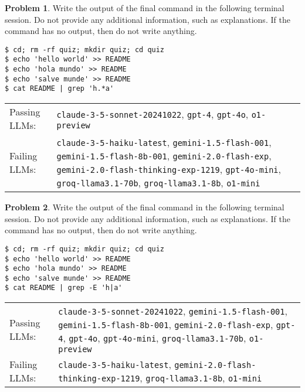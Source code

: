 \documentclass[10pt]{article}
\theoremstyle{definition}
\newtheorem{problem}{Problem}
\begin{document}
\begin{samepage}

\begin{problem}
Write the output of the final command in the following terminal session.
Do not provide any additional information,
such as explanations.
If the command has no output,
then do not write anything.

\end{problem}
\begin{lstlisting}
$ cd; rm -rf quiz; mkdir quiz; cd quiz
$ echo 'hello world' >> README
$ echo 'hola mundo' >> README
$ echo 'salve munde' >> README
$ cat README | grep 'h.*a'
\end{lstlisting}


\noindent
\begin{tabular}{p{1.0in}L{5in}}
Passing LLMs: & {\lstinline$claude-3-5-sonnet-20241022$}, {\lstinline$gpt-4$}, {\lstinline$gpt-4o$}, {\lstinline$o1-preview$} \\
Failing LLMs: & {\lstinline$claude-3-5-haiku-latest$}, {\lstinline$gemini-1.5-flash-001$}, {\lstinline$gemini-1.5-flash-8b-001$}, {\lstinline$gemini-2.0-flash-exp$}, {\lstinline$gemini-2.0-flash-thinking-exp-1219$}, {\lstinline$gpt-4o-mini$}, {\lstinline$groq-llama3.1-70b$}, {\lstinline$groq-llama3.1-8b$}, {\lstinline$o1-mini$} \\
\end{tabular}

\end{samepage}
\begin{samepage}

\begin{problem}
Write the output of the final command in the following terminal session.
Do not provide any additional information,
such as explanations.
If the command has no output,
then do not write anything.

\end{problem}
\begin{lstlisting}
$ cd; rm -rf quiz; mkdir quiz; cd quiz
$ echo 'hello world' >> README
$ echo 'hola mundo' >> README
$ echo 'salve munde' >> README
$ cat README | grep -E 'h|a'
\end{lstlisting}


\noindent
\begin{tabular}{p{1.0in}L{5in}}
Passing LLMs: & {\lstinline$claude-3-5-sonnet-20241022$}, {\lstinline$gemini-1.5-flash-001$}, {\lstinline$gemini-1.5-flash-8b-001$}, {\lstinline$gemini-2.0-flash-exp$}, {\lstinline$gpt-4$}, {\lstinline$gpt-4o$}, {\lstinline$gpt-4o-mini$}, {\lstinline$groq-llama3.1-70b$}, {\lstinline$o1-preview$} \\
Failing LLMs: & {\lstinline$claude-3-5-haiku-latest$}, {\lstinline$gemini-2.0-flash-thinking-exp-1219$}, {\lstinline$groq-llama3.1-8b$}, {\lstinline$o1-mini$} \\
\end{tabular}

\end{samepage}
\end{document}
